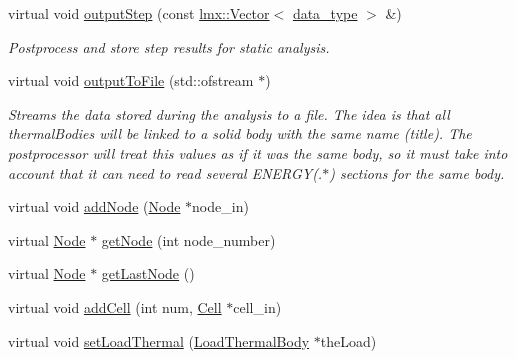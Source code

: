 \begin{DoxyCompactItemize}
virtual void \hyperlink{classmknix_1_1_thermal_body_aeff32a838c44c34140791a39f46dbce3}{output\+Step} (const \hyperlink{classlmx_1_1_vector}{lmx\+::\+Vector}$<$ \hyperlink{namespacemknix_a16be4b246fbf2cceb141e3a179111020}{data\+\_\+type} $>$ \&)
\begin{DoxyCompactList}\small\item\em Postprocess and store step results for static analysis. \end{DoxyCompactList}\item 
virtual void \hyperlink{classmknix_1_1_thermal_body_a0a5734b63446b11a6176eed0255efd6f}{output\+To\+File} (std\+::ofstream $\ast$)
\begin{DoxyCompactList}\small\item\em Streams the data stored during the analysis to a file. The idea is that all thermal\+Bodies will be linked to a solid body with the same name (title). The postprocessor will treat this values as if it was the same body, so it must take into account that it can need to read several E\+N\+E\+R\+G\+Y(.$\ast$) sections for the same body. \end{DoxyCompactList}\item 
virtual void \hyperlink{classmknix_1_1_thermal_body_a654e240414932dc953ed01dfb74bcef2}{add\+Node} (\hyperlink{classmknix_1_1_node}{Node} $\ast$node\+\_\+in)
\item 
virtual \hyperlink{classmknix_1_1_node}{Node} $\ast$ \hyperlink{classmknix_1_1_thermal_body_a5808d882210cc01f52f98b228d5eec52}{get\+Node} (int node\+\_\+number)
\item 
virtual \hyperlink{classmknix_1_1_node}{Node} $\ast$ \hyperlink{classmknix_1_1_thermal_body_a2f81cf2beefe00b1d1b9a9cee265deb2}{get\+Last\+Node} ()
\item 
virtual void \hyperlink{classmknix_1_1_thermal_body_a0a21d64ebd286d4afd3715f1f9faa268}{add\+Cell} (int num, \hyperlink{classmknix_1_1_cell}{Cell} $\ast$cell\+\_\+in)
\item 
virtual void \hyperlink{classmknix_1_1_thermal_body_af1615f6d84e848749d98854ffd7bee50}{set\+Load\+Thermal} (\hyperlink{classmknix_1_1_load_thermal_body}{Load\+Thermal\+Body} $\ast$the\+Load)
\end{DoxyCompactItemize}

